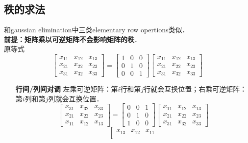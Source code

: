 \documentclass[12pt]{article}
\begin{document}
\begin{CJK}{UTF8}{gbsn}
\subsection{秩的求法}
和gaussian elimination中三类elementary row opertions类似．\\
\textbf{前提：矩阵乘以可逆矩阵不会影响矩阵的秩}．\\
原等式
\begin{equation}
\left[
\begin{array}{ccc}
x_{11} & x_{12} & x_{13}\\
x_{21} & x_{22} & x_{23}\\
x_{31} & x_{32} & x_{33}
\end{array}
\right]
=
\left[
\begin{array}{ccc}
1 & 0 & 0\\
0 & 1 & 0\\
0 & 0 & 1
\end{array}
\right]
\left[
\begin{array}{ccc}
x_{11} & x_{12} & x_{13}\\
x_{21} & x_{22} & x_{23}\\
x_{31} & x_{32} & x_{33}
\end{array}
\right]
\end{equation}
\begin{itemize}
\item[\textbf{行间/列间对调}] 左乘可逆矩阵：第$i$行和第$j$行就会互换位置；右乘可逆矩阵：第$i$列和第$j$列就会互换位置．
\begin{equation}
\left[
\begin{array}{ccc}
x_{31} & x_{32} & x_{33}\\
x_{21} & x_{22} & x_{23}\\
x_{11} & x_{12} & x_{13}
\end{array}
\right]
=
\left[
\begin{array}{ccc}
0 & 0 & 1\\
0 & 1 & 0\\
1 & 0 & 0
\end{array}
\right]
\left[
\begin{array}{ccc}
x_{11} & x_{12} & x_{13}\\
x_{21} & x_{22} & x_{23}\\
x_{31} & x_{32} & x_{33}
\end{array}
\right]
\end{equation}
\begin{equation}
\left[
\begin{array}{ccc}
x_{13} & x_{12} & x_{11}\\

\end{array}
\end{equation}
\end{itemize}
\end{CJK}
\end{document}
